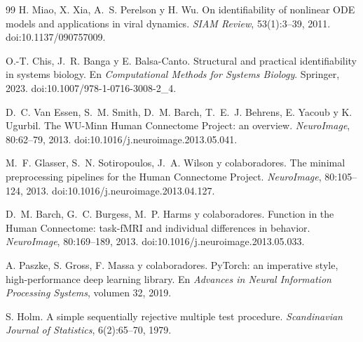 \begin{thebibliography}{99}
H. Miao, X. Xia, A.~S. Perelson y H. Wu.
\newblock On identifiability of nonlinear ODE models and applications in viral dynamics.
\newblock \emph{SIAM Review}, 53(1):3--39, 2011.
\newblock doi:10.1137/090757009.

O.-T. Chis, J.~R. Banga y E. Balsa-Canto.
\newblock Structural and practical identifiability in systems biology.
\newblock En \emph{Computational Methods for Systems Biology}. Springer, 2023.
\newblock doi:10.1007/978-1-0716-3008-2\_4.

D.~C. Van Essen, S.~M. Smith, D.~M. Barch, T.~E.~J. Behrens, E. Yacoub y K. Ugurbil.
\newblock The WU-Minn Human Connectome Project: an overview.
\newblock \emph{NeuroImage}, 80:62--79, 2013.
\newblock doi:10.1016/j.neuroimage.2013.05.041.

M.~F. Glasser, S.~N. Sotiropoulos, J.~A. Wilson y colaboradores.
\newblock The minimal preprocessing pipelines for the Human Connectome Project.
\newblock \emph{NeuroImage}, 80:105--124, 2013.
\newblock doi:10.1016/j.neuroimage.2013.04.127.

D.~M. Barch, G.~C. Burgess, M.~P. Harms y colaboradores.
\newblock Function in the Human Connectome: task-fMRI and individual differences in behavior.
\newblock \emph{NeuroImage}, 80:169--189, 2013.
\newblock doi:10.1016/j.neuroimage.2013.05.033.

A. Paszke, S. Gross, F. Massa y colaboradores.
\newblock PyTorch: an imperative style, high-performance deep learning library.
\newblock En \emph{Advances in Neural Information Processing Systems}, volumen 32, 2019.

S. Holm.
\newblock A simple sequentially rejective multiple test procedure.
\newblock \emph{Scandinavian Journal of Statistics}, 6(2):65--70, 1979.

\end{thebibliography}
